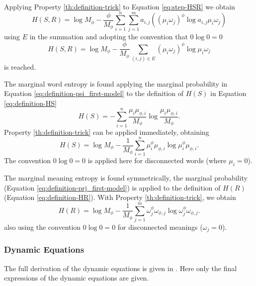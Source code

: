 Applying Property \ref{th:definition-trick} to Equation \eqref{eq:step-HSR} we obtain
\begin{equation*}
  H(S,R) = \log M_\phi - \frac{\phi}{M_\phi} \sum_{i=1}^n \sum_{j=1}^m a_{i,j} \left( (\mu_i \omega_j)^\phi \log a_{i,j} \mu_i \omega_j \right)
\end{equation*}
using $E$ in the summation and adopting the convention that $0 \log 0 = 0$
\begin{equation}
  \label{eq:definition-HSR_first-model}
  H(S,R) = \log M_\phi - \frac{\phi}{M_\phi} \sum_{(i,j) \in E} (\mu_i \omega_j)^\phi \log \mu_i \omega_j
\end{equation}
is reached.

The marginal word entropy is found applying the marginal probability in Equation \eqref{eq:definition-psi_first-model} to the definition of $H(S)$ in Equation \eqref{eq:definition-HS}
\begin{equation*}
  H(S) = -\sum_{i=1}^n \frac{\mu_i \mu_{\phi,i}}{M_\phi} \log \frac{\mu_i \mu_{\phi,i}}{M_\phi}.
\end{equation*}
Property \ref{th:definition-trick} can be applied immediately, obtaining
\begin{equation}
  \label{eq:definition-HS_first-model}
  H(S) = \log M_\phi - \frac{1}{M_\phi} \sum_{i=1}^n \mu_i^\phi \mu_{\phi,i} \log \mu_i^\phi \mu_{\phi,i}.
\end{equation}
The convention $0 \log 0 = 0$ is applied here for disconnected words (where $\mu_i = 0$).

The marginal meaning entropy is found symmetrically, the marginal probability (Equation \eqref{eq:definition-prj_first-model}) is applied to the definition of $H(R)$ (Equation \eqref{eq:definition-HR}).
With Property \eqref{th:definition-trick}, we obtain
\begin{equation}
  \label{eq:definition-HR_first-model}
  H(R) = \log M_\phi - \frac{1}{M_\phi} \sum_{j=1}^m \omega_j^\phi \omega_{\phi,j} \log \omega_j^\phi \omega_{\phi,j}.
\end{equation}
also using the convention $0 \log 0 = 0$ for disconnected meanings ($\omega_j=0$).

\subsubsection{Dynamic Equations}

The full derivation of the dynamic equations is given in \cite{Carrera2021a}.
Here only the final expressions of the dynamic equations are given.

